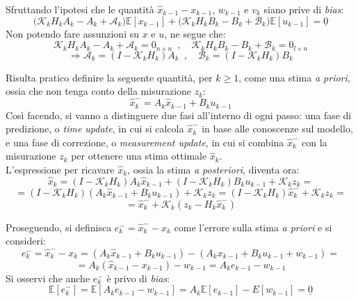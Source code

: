 \documentclass[12pt,a4paper,openright,twoside]{book}
\begin{document}
Sfruttando l'ipotesi che le quantità $\hat{x}_{k-1}-x_{k-1}$, $w_{k-1}$ e $v_k$ siano prive di \textit{bias}:
$$\bigl(\mathcal{K}_kH_kA_k-A_k+\mathcal{A}_k\bigr)\mathbb{E}[x_{k-1}]+\bigl(\mathcal{K}_kH_kB_k-B_k+\mathcal{B}_k\bigr)\mathbb{E}[u_{k-1}]=\underline{0}$$
Non potendo fare assunzioni su $x$ e $u$, ne segue che:
$$\mathcal{K}_kH_kA_k-A_k+\mathcal{A}_k=0_{n\times n}\enspace,\quad\mathcal{K}_kH_kB_k-B_k+\mathcal{B}_k=0_{l\times n}$$
$$\Rightarrow\mathcal{A}_k=(I-\mathcal{K}_kH_k)A_k\enspace,\quad\mathcal{B}_k=(I-\mathcal{K}_kH_k)B_k$$

Risulta pratico definire la seguente quantità, per $k\geq 1$, come una stima \textit{a priori}, ossia che non tenga conto della misurazione $z_k$:
$$\hat{x}_k^-=A_k\hat{x}_{k-1}+B_ku_{k-1}$$
Così facendo, si vanno a distinguere due fasi all'interno di ogni passo: una fase di predizione, o \textit{time update}, in cui si calcola $\hat{x}_k^-$ in base alle conoscenze sul modello, e una fase di correzione, o \textit{measurement update}, in cui si combina $\hat{x}_k^-$ con la misurazione $z_k$ per ottenere una stima ottimale $\hat{x}_k$. \\
L'espressione per ricavare $\hat{x}_k$, ossia la stima \textit{a posteriori}, diventa ora:
$$\hat{x}_k=(I-\mathcal{K}_kH_k)A_k\hat{x}_{k-1}+(I-\mathcal{K}_kH_k)B_ku_{k-1}+\mathcal{K}_kz_k=$$
$$=(I-\mathcal{K}_kH_k)(A_k\hat{x}_{k-1}+B_ku_{k-1})+\mathcal{K}_kz_k=(I-\mathcal{K}_kH_k)\hat{x}_k^-+\mathcal{K}_kz_k=$$
$$=\hat{x}_k^-+\mathcal{K}_k(z_k-H_k\hat{x}_k^-)$$

Proseguendo, si definisca $e_k^-=\hat{x}_k^--x_k$ come l'errore sulla stima \textit{a priori} e si consideri:
$$e_k^-=\hat{x}_k^--x_k=(A_k\hat{x}_{k-1}+B_ku_{k-1})-(A_kx_{k-1}+B_ku_{k-1}+w_{k-1})=$$
$$=A_k(\hat{x}_{k-1}-x_{k-1})-w_{k-1}=A_ke_{k-1}-w_{k-1}$$
Si osservi che anche $e_k^-$ è privo di \textit{bias}:
$$\mathbb{E}[e_k^-]=\mathbb{E}[A_ke_{k-1}-w_{k-1}]=A_k\mathbb{E}[e_{k-1}]-E[w_{k-1}]=\underline{0}$$
\end{document}
